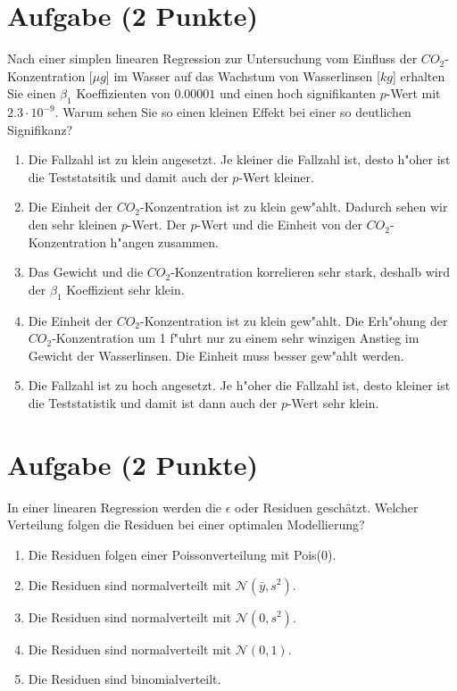\documentclass[a4paper, 9pt]{scrartcl}\usepackage[]{graphicx}\usepackage[]{xcolor}
\begin{document}
\section{Aufgabe \hfill (2 Punkte)}

Nach einer simplen linearen Regression zur Untersuchung vom Einfluss der
$CO_2$-Konzentration [$\mu g$] im Wasser auf das Wachstum von Wasserlinsen
[$kg$] erhalten Sie einen $\beta_1$ Koeffizienten von $0.00001$ und einen
hoch signifikanten $p$-Wert mit $2.3\cdot 10^{-9}$. Warum sehen Sie so einen kleinen
Effekt bei einer so deutlichen Signifikanz? 




\begin{enumerate}
\item [\textbf{A} \msquare] Die Fallzahl ist zu klein angesetzt. Je kleiner die Fallzahl ist, desto h{"o}her ist die Teststatsitik und damit auch der $p$-Wert kleiner. 
\item [\textbf{B} \msquare] Die Einheit der $CO_2$-Konzentration ist zu klein gew{"a}hlt. Dadurch sehen wir den sehr kleinen $p$-Wert. Der $p$-Wert und die Einheit von der $CO_2$-Konzentration h{"a}ngen zusammen.
\item [\textbf{C} \msquare] Das Gewicht und die $CO_2$-Konzentration korrelieren sehr stark, deshalb wird der $\beta_1$ Koeffizient sehr klein.
\item [\textbf{D} \msquare] Die Einheit der $CO_2$-Konzentration ist zu klein gew{"a}hlt. Die Erh{"o}hung der $CO_2$-Konzentration um 1 f{"u}hrt nur zu einem sehr winzigen Anstieg im Gewicht der Wasserlinsen. Die Einheit muss besser gew{"a}hlt werden.
\item [\textbf{E} \msquare] Die Fallzahl ist zu hoch angesetzt. Je h{"o}her die Fallzahl ist, desto kleiner ist die Teststatistik und damit ist dann auch der $p$-Wert sehr klein.
\end{enumerate}

\section{Aufgabe \hfill (2 Punkte)}

In einer linearen Regression werden die $\epsilon$ oder Residuen
gesch{\"a}tzt. Welcher Verteilung folgen die Residuen bei einer optimalen
Modellierung? 



\begin{enumerate}
\item [\textbf{A} \msquare] Die Residuen folgen einer Poissonverteilung mit Pois(0).
\item [\textbf{B} \msquare] Die Residuen sind normalverteilt mit $\mathcal{N}(\bar{y}, s^2)$.
\item [\textbf{C} \msquare] Die Residuen sind normalverteilt mit $\mathcal{N}(0, s^2)$.
\item [\textbf{D} \msquare] Die Residuen sind normalverteilt mit $\mathcal{N}(0, 1)$.
\item [\textbf{E} \msquare] Die Residuen sind binomialverteilt.
\end{enumerate}
\end{document}
